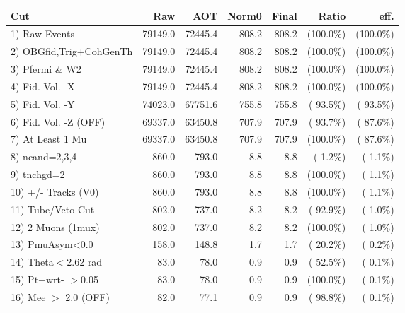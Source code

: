  \begin{table}[h!]\centering
 \begin{tabular}{||l||r|r|r|r|r|r||}
 \hline
 \hline
 Cut & Raw & AOT & Norm0 & Final & Ratio & eff.       \\
 \hline
  1) Raw Events           &      79149.0 &      72445.4 &        808.2 &        808.2 & (100.0\%) & (100.0\%) \\
  2) OBGfid,Trig+CohGenTh &      79149.0 &      72445.4 &        808.2 &        808.2 & (100.0\%) & (100.0\%) \\
  3) Pfermi \& W2         &      79149.0 &      72445.4 &        808.2 &        808.2 & (100.0\%) & (100.0\%) \\
  4) Fid. Vol. -X         &      79149.0 &      72445.4 &        808.2 &        808.2 & (100.0\%) & (100.0\%) \\
  5) Fid. Vol. -Y         &      74023.0 &      67751.6 &        755.8 &        755.8 & ( 93.5\%) & ( 93.5\%) \\
  6) Fid. Vol. -Z (OFF)   &      69337.0 &      63450.8 &        707.9 &        707.9 & ( 93.7\%) & ( 87.6\%) \\
  7) At Least 1 Mu        &      69337.0 &      63450.8 &        707.9 &        707.9 & (100.0\%) & ( 87.6\%) \\
  8) ncand=2,3,4          &        860.0 &        793.0 &          8.8 &          8.8 & (  1.2\%) & (  1.1\%) \\
  9) tnchgd=2             &        860.0 &        793.0 &          8.8 &          8.8 & (100.0\%) & (  1.1\%) \\
 10) +/- Tracks (V0)      &        860.0 &        793.0 &          8.8 &          8.8 & (100.0\%) & (  1.1\%) \\
 11) Tube/Veto Cut        &        802.0 &        737.0 &          8.2 &          8.2 & ( 92.9\%) & (  1.0\%) \\
 12) 2 Muons (1mux)       &        802.0 &        737.0 &          8.2 &          8.2 & (100.0\%) & (  1.0\%) \\
 13) PmuAsym<0.0          &        158.0 &        148.8 &          1.7 &          1.7 & ( 20.2\%) & (  0.2\%) \\
 14) Theta$<$2.62 rad     &         83.0 &         78.0 &          0.9 &          0.9 & ( 52.5\%) & (  0.1\%) \\
 15) Pt+wrt- $>$0.05      &         83.0 &         78.0 &          0.9 &          0.9 & (100.0\%) & (  0.1\%) \\
 16) Mee $>$ 2.0  (OFF)   &         82.0 &         77.1 &          0.9 &          0.9 & ( 98.8\%) & (  0.1\%) \\

\end{tabular}
\end{table}
